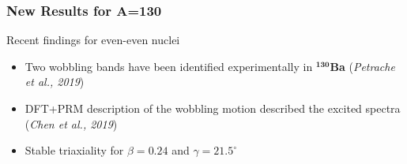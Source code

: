 \documentclass{beamer}
\begin{document}
\begin{frame}
  \frametitle{New Results for A=130}
  \begin{minipage}{.8\textwidth}
    \begin{block}{Recent findings for even-even nuclei}
      \begin{itemize}
        \item Two wobbling bands have been identified experimentally in \textbf{$^\mathbf{130}$Ba} (\textit{Petrache et al., 2019})
        \item DFT+PRM description of the wobbling motion described the excited spectra (\textit{Chen et al., 2019})
        \item Stable triaxiality for $\beta=0.24$ and $\gamma=21.5^\circ$
      \end{itemize}
    \end{block}
  \end{minipage}%
  \begin{minipage}{.2\textwidth}
    \begin{figure}
      \centering

\end{figure}
\end{minipage}
\end{frame}
\end{document}
